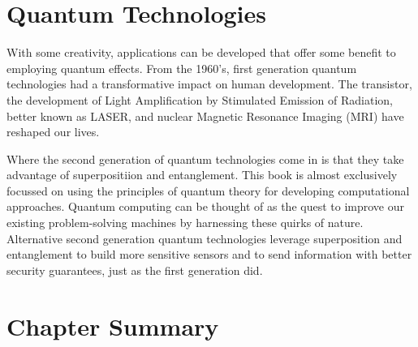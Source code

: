 



\section{Quantum Technologies}


With some creativity, applications can be developed that offer some benefit to employing quantum effects. From the 1960's, first generation quantum technologies had a transformative impact on human development. The transistor, the development of Light Amplification by Stimulated Emission of Radiation, better known as LASER, and nuclear Magnetic Resonance Imaging (MRI) have reshaped our lives. 

Where the second generation of quantum technologies come in is that they take advantage of superpositiion and entanglement.  This book is almost exclusively focussed on using the principles of quantum theory for developing computational approaches. Quantum computing can be thought of as the quest to improve our existing problem-solving machines by harnessing these quirks of nature. Alternative second generation quantum technologies leverage superposition and entanglement to build more sensitive sensors and to send information with better security guarantees, just as the first generation did. 

\section{Chapter Summary} 

